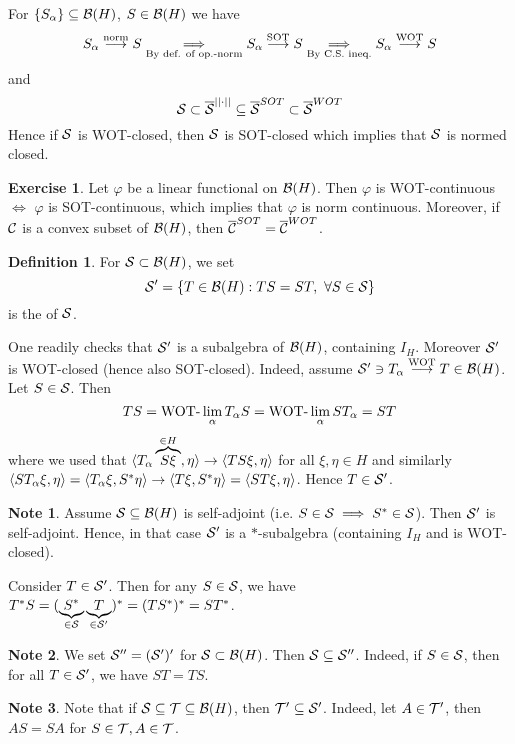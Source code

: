 \documentclass[10pt,english,a4paper]{article}
\theoremstyle{definition}
\newtheorem*{definition}{Definition}
\newtheorem*{exercise}{Exercise}
\newtheorem*{note}{Note}
\let\emph\relax %
\def\vphi{\varphi}
\begin{document}
For $\{S_{\alpha}\} \subseteq \mathcal{B}(H)$, $S \in \mathcal{B}(H) $ we have 
\[ S_{\alpha} \overset{\text{norm}}{\longrightarrow} S
\underset{\text{By def. of op.-norm}}{\implies}
S_{\alpha} \overset{\text{SOT}}{\longrightarrow} S
\underset{\text{By C.S. ineq.}}{\implies}
S_{\alpha} \overset{\text{WOT}}{\longrightarrow} S
\]
and
\[ \mathcal{S} \subset \overline{\mathcal{S}}^{||\cdot||} \subseteq \overline{\mathcal{S}}^{SOT} \subset \overline{\mathcal{S}}^{WOT} \]
Hence if $\mathcal{S}$ is WOT-closed, then $\mathcal{S}$ is SOT-closed which implies that 
$\mathcal{S}$ is normed closed.

\begin{exercise}
Let $\vphi$ be a linear functional on $\mathcal{B}(H)$. Then $\vphi$ is WOT-continuous 
$\iff$ $\vphi$ is SOT-continuous, which implies that $\vphi$ is norm continuous.
Moreover, if $\mathcal{C}$ is a convex subset of $\mathcal{B}(H)$, then 
$\overline{\mathcal{C}}^{SOT} = \overline{\mathcal{C}}^{WOT}$.
\end{exercise}

\begin{definition}
    For $\mathcal{S}\subset\mathcal{B}(H)$, we set 
\[\mathcal{S}' = \{T \in \mathcal{B}(H): TS=ST,~\forall S\in \mathcal{S}\}\]
is the \emph{commutant} of $\mathcal{S}$.
\end{definition}

One readily checks that $\mathcal{S}'$ is a subalgebra of $\mathcal{B}(H)$, containing $I_H$.
Moreover $\mathcal{S}'$ is WOT-closed (hence also SOT-closed).
Indeed, assume $\mathcal{S}' \ni T_{\alpha}\overset{\text{WOT}}{\longrightarrow} T \in \mathcal{B}(H)$.
Let $S \in \mathcal{S}$. Then 
\[TS = \text{WOT-}\lim_{\alpha} T_{\alpha}S = \text{WOT-}\lim_{\alpha}ST_{\alpha} = ST \]
where we used that 
$\langle T_{\alpha}\overbrace{S\xi}^{\in H},\eta \rangle \to \left\langle TS\xi,\eta \right\rangle$
for all $\xi,\eta \in H$ and 
similarly $\left\langle ST_{\alpha}\xi,\eta \right\rangle = \left\langle T_{\alpha}\xi,S^*\eta \right\rangle \to
\left\langle T\xi,S^*\eta \right\rangle = \left\langle ST\xi,\eta \right\rangle$.
Hence $T \in \mathcal{S}'$.


\begin{note}
Assume $\mathcal{S}\subseteq \mathcal{B}(H)$ is self-adjoint (i.e. $S \in \mathcal{S} \implies S^* \in \mathcal{S}$).
Then $\mathcal{S}'$ is self-adjoint. Hence, in that case  $\mathcal{S}'$ is  a $*$-subalgebra
(containing  $I_H$ and is WOT-closed).  
\end{note}
Consider $T \in \mathcal{S}'$. Then for any $S \in \mathcal{S}$, we have 
$T^*S = (\underbrace{S^*}_{\in \mathcal{S}}\underbrace{T}_{\in \mathcal{S}'})^* = (TS^*)^* = ST^*$.

\begin{note}
We set $\mathcal{S}'' = (\mathcal{S}')'$ for $\mathcal{S} \subset \mathcal{B}(H)$.
Then $\mathcal{S} \subseteq \mathcal{S}''$.
Indeed, if $S \in \mathcal{S}$, then for all $T \in \mathcal{S}'$, we have $ST = TS$.
\end{note}

\begin{note}
Note that if $\mathcal{S} \subseteq \mathcal{T} \subseteq \mathcal{B}(H)$, then 
 $\mathcal{T}' \subseteq \mathcal{S}'$. 
Indeed, let $A \in \mathcal{T}'$, then $AS = SA$ for $S \in \mathcal{T}, A \in \mathcal{T}$.
\end{note}
\end{document}
